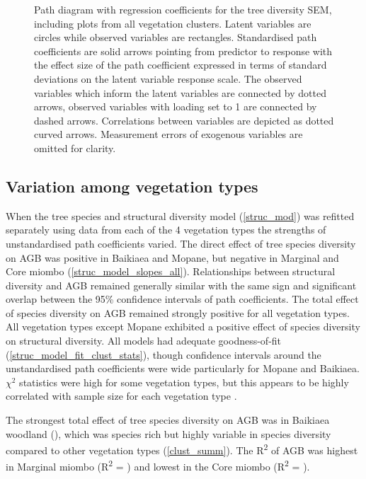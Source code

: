 \documentclass[11pt,a4paper]{article}
\begin{document}
\begin{figure}[H]
\centering
	
	\caption{Path diagram with regression coefficients for the tree diversity SEM, including plots from all vegetation clusters. Latent variables are circles while observed variables are rectangles. Standardised path coefficients are solid arrows pointing from predictor to response with the effect size of the path coefficient expressed in terms of standard deviations on the latent variable response scale. The observed variables which inform the latent variables are connected by dotted arrows, observed variables with loading set to 1 are connected by dashed arrows. Correlations between variables are depicted as dotted curved arrows. Measurement errors of exogenous variables are omitted for clarity.}
	\label{struc_mod}
\end{figure}

\subsection*{Variation among vegetation types}

When the tree species and structural diversity model (\autoref{struc_mod}) was refitted separately using data from each of the 4 vegetation types the strengths of unstandardised path coefficients varied.  The direct effect of tree species diversity on AGB was positive in Baikiaea and Mopane, but negative in Marginal and Core miombo (\autoref{struc_model_slopes_all}). Relationships between structural diversity and AGB remained generally similar with the same sign and significant overlap between the 95\% confidence intervals of path coefficients. The total effect of species diversity on AGB remained strongly positive for all vegetation types. All vegetation types except Mopane exhibited a positive effect of species diversity on structural diversity. All models had adequate goodness-of-fit (\autoref{struc_model_fit_clust_stats}), though confidence intervals around the unstandardised path coefficients were wide particularly for Mopane and Baikiaea. $\chi^{2}$ statistics were high for some vegetation types, but this appears to be highly correlated with sample size for each vegetation type \citep{Hooper2008}.

The strongest total effect of tree species diversity on AGB was in Baikiaea woodland (\struccsb{}), which was species rich but highly variable in species diversity compared to other vegetation types (\autoref{clust_summ}). The R\textsuperscript{2} of AGB was highest in Marginal miombo (R\textsuperscript{2} = \strucarsq{}) and lowest in the Core miombo (R\textsuperscript{2} = \strucbrsq{}).
\end{document}
